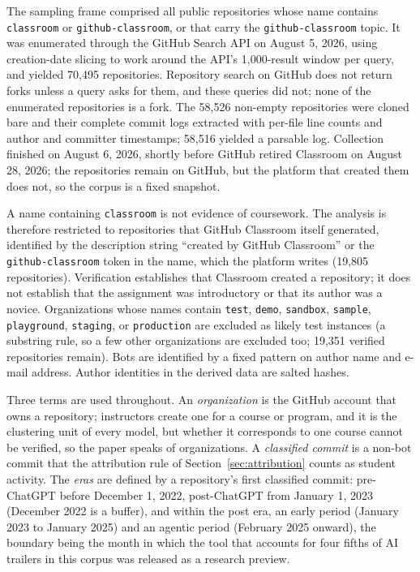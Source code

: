 \documentclass[acmsmall,screen,review,anonymous]{acmart}
\begin{document}
The sampling frame comprised all public repositories whose name contains \texttt{classroom} or \texttt{github-classroom}, or that carry the \texttt{github-classroom} topic. It was enumerated through the GitHub Search API on August 5, 2026, using creation-date slicing to work around the API's 1,000-result window per query, and yielded 70,495 repositories. Repository search on GitHub does not return forks unless a query asks for them, and these queries did not; none of the enumerated repositories is a fork. The 58,526 non-empty repositories were cloned bare and their complete commit logs extracted with per-file line counts and author and committer timestamps; 58,516 yielded a parsable log. Collection finished on August 6, 2026, shortly before GitHub retired Classroom on August 28, 2026; the repositories remain on GitHub, but the platform that created them does not, so the corpus is a fixed snapshot.

A name containing \texttt{classroom} is not evidence of coursework. The analysis is therefore restricted to repositories that GitHub Classroom itself generated, identified by the description string ``created by GitHub Classroom'' or the \texttt{github-classroom} token in the name, which the platform writes (19,805 repositories). Verification establishes that Classroom created a repository; it does not establish that the assignment was introductory or that its author was a novice. Organizations whose names contain \texttt{test}, \texttt{demo}, \texttt{sandbox}, \texttt{sample}, \texttt{playground}, \texttt{staging}, or \texttt{production} are excluded as likely test instances (a substring rule, so a few other organizations are excluded too; 19,351 verified repositories remain). Bots are identified by a fixed pattern on author name and e-mail address. Author identities in the derived data are salted hashes.

Three terms are used throughout. An \textit{organization} is the GitHub account that owns a repository; instructors create one for a course or program, and it is the clustering unit of every model, but whether it corresponds to one course cannot be verified, so the paper speaks of organizations. A \textit{classified commit} is a non-bot commit that the attribution rule of Section~\ref{sec:attribution} counts as student activity. The \textit{eras} are defined by a repository's first classified commit: pre-ChatGPT before December 1, 2022, post-ChatGPT from January 1, 2023 (December 2022 is a buffer), and within the post era, an early period (January 2023 to January 2025) and an agentic period (February 2025 onward), the boundary being the month in which the tool that accounts for four fifths of AI trailers in this corpus was released as a research preview.
\end{document}
